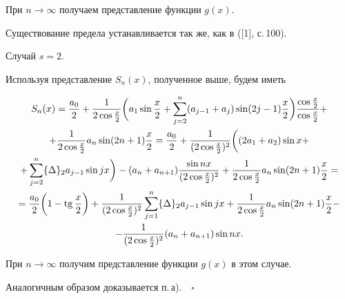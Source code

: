 При $n\to \infty$ получаем представление функции $g(x)$.


Существование предела устанавливается так же, как в ([1], с.\,100).





Случай $s=2$.


Используя представление $S_n(x)$, полученное выше, будем иметь


\begin{gather*}


S_n(x)=\frac{a_0}{2}+ \frac{1}{2\cos{\frac{x}{2}}}


\bigg(a_1\sin{\frac{x}{2}}+


\sum\limits_{j=2}^{n}(a_{j-1}+a_j)\sin(2j-1){\frac{x}{2}}\bigg) 


\frac{\cos{\frac{x}{2}}}{\cos{\frac{x}{2}}}+\\


%


+\frac{1}{2\cos{\frac{x}{2}}}


a_n\sin(2n+1){\frac{x}{2}}=


\frac{a_0}{2}+\frac{1}{(2\cos{\frac{x}{2}})^2}\bigg((2a_1+a_2)\sin x+\\


%


+\sum\limits_{j=2}^{n}\{\Delta\}_2a_{j-1}\sin jx\bigg)


-(a_n+a_{n+1})\frac{\sin nx}{(2\cos{\frac{x}{2}})^2}+


\frac{1}{2\cos{\frac{x}{2}}} a_n \sin(2n+1){\frac{x}{2}} = \\


%


=\frac{a_0}{2}\bigg(1-\tg\frac{x}{2}\bigg)+\frac{1}{(2\cos\frac{x}{2})^2}


\sum\limits_{j=1}^{n}\{\Delta\}_2a_{j-1}\sin jx +


\frac{1}{2\cos{\frac{x}{2}}} a_n\sin(2n+1){\frac{x}{2}}- \\


%


-\frac{1}{(2\cos\frac{x}{2})^2}(a_n+a_{n+1})\sin nx.


\end{gather*}


При $n\to \infty$ получим представление функции $g(x)$ в этом случае.





Аналогичным образом доказывается п.\,а).$\quad\square$





